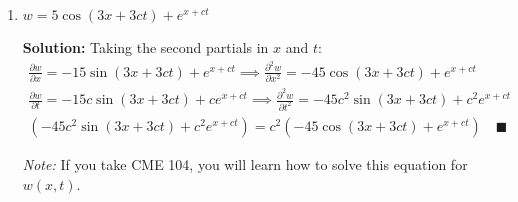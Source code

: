 \documentclass[letterpaper, 11pt]{article}
\begin{document}
\begin{enumerate}
\begin{enumerate}[label = (\alph*)]
\item $w = 5 \cos( 3x + 3ct) + e^{x + ct}$
\par \textbf{Solution:} Taking the second partials in $x$ and $t$:
\begin{gather*}
\frac{ \partial w}{\partial x} = -15 \sin (3x + 3ct) + e^{x + ct} \implies \frac{ \partial^2 w}{\partial x^2} = -45 \cos (3x + 3ct) + e^{x + ct}  \\
\frac{\partial w}{\partial t} = -15c \sin(3x + 3ct) + ce^{x + ct} \implies \frac{ \partial^2 w}{\partial t^2} = -45c^2 \sin(3x + 3ct) + c^2 e^{x + ct}   \\
\left(  -45c^2 \sin(3x + 3ct) + c^2 e^{x + ct} \right) = c^2 \left( -45 \cos (3x + 3ct) + e^{x + ct} \right) \quad\blacksquare
\end{gather*}


\par \textit{Note:} If you take CME 104, you will learn how to solve this equation for $w(x,t)$. 

\end{enumerate}

\end{enumerate}

\end{document}
